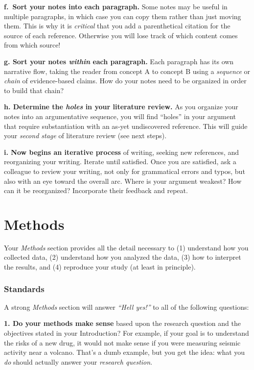 \documentclass[
]{book}
\begin{document}
\textbf{f.~Sort your notes into each paragraph.} Some notes may be useful in multiple paragraphs, in which case you can copy them rather than just moving them. This is why it is \emph{critical} that you add a parenthetical citation for the source of each reference. Otherwise you will lose track of which content comes from which source!

\textbf{g. Sort your notes \emph{within} each paragraph.} Each paragraph has its own narrative flow, taking the reader from concept A to concept B using a \emph{sequence} or \emph{chain} of evidence-based claims. How do your notes need to be organized in order to build that chain?

\textbf{h. Determine the \emph{holes} in your literature review.} As you organize your notes into an argumentative sequence, you will find ``holes'' in your argument that require substantiation with an as-yet undiscovered reference. This will guide your \emph{second stage} of literature review (see next steps).

\textbf{i. Now begins an iterative process} of writing, seeking new references, and reorganizing your writing. Iterate until satisfied. Once you are satisfied, ask a colleague to review your writing, not only for grammatical errors and typos, but also with an eye toward the overall arc. Where is your argument weakest? How can it be reorganized? Incorporate their feedback and repeat.

\hypertarget{methods}{%
\section*{Methods}\label{methods}}

Your \emph{Methods} section provides all the detail necessary to (1) understand how you collected data, (2) understand how you analyzed the data, (3) how to interpret the results, and (4) reproduce your study (at least in principle).

\hypertarget{standards-2}{%
\subsubsection*{Standards}\label{standards-2}}

A strong \emph{Methods} section will answer \emph{``Hell yes!''} to all of the following questions:

\textbf{1. Do your methods make sense} based upon the research question and the objectives stated in your Introduction? For example, if your goal is to understand the risks of a new drug, it would not make sense if you were measuring seismic activity near a volcano. That's a dumb example, but you get the idea: what you \emph{do} should actually answer your \emph{research question}.
\end{document}
